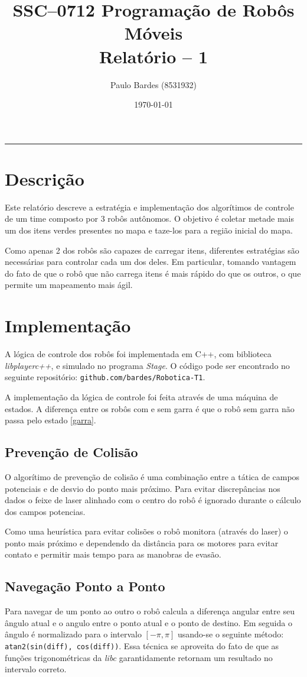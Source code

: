 \documentclass[11pt,oneside]{article}
\title{
\vspace{-3cm}	%
SSC--0712 Programação de Robôs Móveis \\
Relatório -- 1
}
\author {
Paulo Bardes (8531932)
}
\date {\today}
\begin{document}
\maketitle
\vspace{-6mm}
\hrule

\section{Descrição}
Este relatório descreve a estratégia e implementação dos algorítimos de controle de um time composto por 3 robôs autônomos. O objetivo é coletar metade mais um dos itens verdes presentes no mapa e taze-los para a região inicial do mapa.

Como apenas 2 dos robôs são capazes de carregar itens, diferentes estratégias são necessárias para controlar cada um dos deles. Em particular, tomando vantagem do fato de que o robô que não carrega itens é mais rápido do que os outros, o que permite um mapeamento mais ágil.

\section{Implementação}

A lógica de controle dos robôs foi implementada em C++, com biblioteca \emph{libplayerc++}, e simulado no programa \emph{Stage}. O código pode ser encontrado no seguinte repositório: \texttt{github.com/bardes/Robotica-T1}.

A implementação da lógica de controle foi feita através de uma máquina de estados. A diferença entre os robôs com e sem garra é que o robô sem garra não passa pelo estado \ref{garra}.

\subsection{Prevenção de Colisão}
O algorítimo de prevenção de colisão é uma combinação entre a tática de campos potenciais e de desvio do ponto mais próximo. Para evitar discrepâncias nos dados o feixe de laser alinhado com o centro do robô é ignorado durante o cálculo dos campos potencias.

Como uma heurística para evitar colisões o robô monitora (através do laser) o ponto mais próximo e dependendo da distância para os motores para evitar contato e permitir mais tempo para as manobras de evasão.

\subsection{Navegação Ponto a Ponto}
Para navegar de um ponto ao outro o robô calcula a diferença angular entre seu ângulo atual e o angulo entre o ponto atual e o ponto de destino. Em seguida o ângulo é normalizado para o intervalo $[-\pi, \pi]$ usando-se o seguinte método: \texttt{atan2(sin(diff), cos(diff))}. Essa técnica se aproveita do fato de que as funções trigonométricas da \emph{libc} garantidamente retornam um resultado no intervalo correto.
\end{document}
